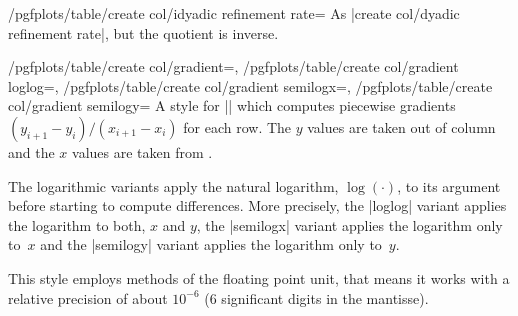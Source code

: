 \begin{stylekey}{/pgfplots/table/create col/idyadic refinement rate=}
	As |create col/dyadic refinement rate|, but the quotient is inverse.
\end{stylekey}

\begin{keylist}{
	/pgfplots/table/create col/gradient=,
	/pgfplots/table/create col/gradient loglog=,
	/pgfplots/table/create col/gradient semilogx=,
	/pgfplots/table/create col/gradient semilogy=}
	A style for |\pgfplotstablecreatecol| which computes piecewise gradients $(y_{i+1} - y_i) / (x_{i+1} - x_i )$ for each row. The $y$ values are taken out of column  and the $x$ values are taken from .
	
	The logarithmic variants apply the natural logarithm, $\log(\cdot)$, to its argument before starting to compute differences. More precisely, the |loglog| variant applies the logarithm to both, $x$ and $y$, the |semilogx| variant applies the logarithm only to~$x$ and the |semilogy| variant applies the logarithm only to~$y$.
	
\begin{codeexample}[]
\end{codeexample}

\begin{codeexample}[]
\end{codeexample}
	This style employs methods of the floating point unit, that means it works with a relative precision of about $10^{-6}$ ($6$ significant digits in the mantisse).
\end{keylist}

